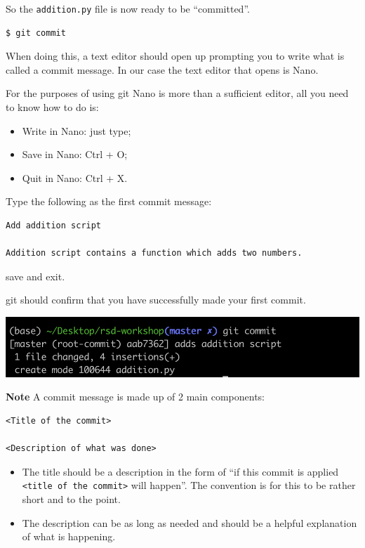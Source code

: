 \documentclass[11pt]{article}
\providecommand{\tightlist}{%
      \setlength{\itemsep}{0pt}\setlength{\parskip}{0pt}}
\begin{document}
    So the \texttt{addition.py} file is now ready to be ``committed''.

\begin{verbatim}
$ git commit
\end{verbatim}

When doing this, a text editor should open up prompting you to write
what is called a commit message. In our case the text editor that opens
is Nano.

For the purposes of using git Nano is more than a sufficient editor, all
you need to know how to do is:

\begin{itemize}
\tightlist
\item
  Write in Nano: just type;
\item
  Save in Nano: Ctrl + O;
\item
  Quit in Nano: Ctrl + X.
\end{itemize}

    Type the following as the first commit message:

\begin{verbatim}
Add addition script

Addition script contains a function which adds two numbers.
\end{verbatim}

save and exit.

git should confirm that you have successfully made your first commit.

\includegraphics{static/git_commit.png}

    \textbf{Note} A commit message is made up of 2 main components:

\begin{verbatim}
<Title of the commit>

<Description of what was done>
\end{verbatim}

\begin{itemize}
\tightlist
\item
  The title should be a description in the form of ``if this commit is
  applied \texttt{\textless{}title\ of\ the\ commit\textgreater{}} will
  happen''. The convention is for this to be rather short and to the
  point.
\item
  The description can be as long as needed and should be a helpful
  explanation of what is happening.
\end{itemize}
\end{document}
